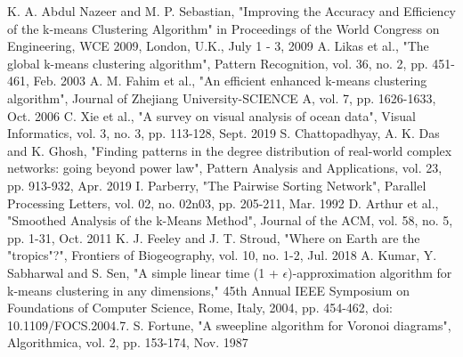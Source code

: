 \documentclass[conference,compsoc]{IEEEtran}
\begin{document}
\begin{thebibliography}{00}
 K. A. Abdul Nazeer and M. P. Sebastian, "Improving the Accuracy and Efficiency of the k-means Clustering Algorithm" in Proceedings of the World Congress on Engineering, WCE 2009, London, U.K., July 1 - 3, 2009
 A. Likas et al., "The global k-means clustering algorithm", Pattern Recognition, vol. 36, no. 2, pp. 451-461, Feb. 2003
 A. M. Fahim et al., "An efficient enhanced k-means clustering algorithm", Journal of Zhejiang University-SCIENCE A, vol. 7, pp. 1626-1633, Oct. 2006
 C. Xie et al., "A survey on visual analysis of ocean data", Visual Informatics, vol. 3, no. 3, pp. 113-128, Sept. 2019
 S. Chattopadhyay, A. K. Das and K. Ghosh, "Finding patterns in the degree distribution of real-world complex networks: going beyond power law", Pattern Analysis and Applications, vol. 23, pp. 913-932, Apr. 2019
 I. Parberry, "The Pairwise Sorting Network", Parallel Processing Letters, vol. 02, no. 02n03, pp. 205-211, Mar. 1992
 D. Arthur et al., "Smoothed Analysis of the k-Means Method", Journal of the ACM, vol. 58, no. 5, pp. 1-31, Oct. 2011
 K. J. Feeley and J. T. Stroud, "Where on Earth are the "tropics"?", Frontiers of Biogeography, vol. 10, no. 1-2, Jul. 2018
 A. Kumar, Y. Sabharwal and S. Sen, "A simple linear time (1 + $\epsilon$)-approximation algorithm for k-means clustering in any dimensions," 45th Annual IEEE Symposium on Foundations of Computer Science, Rome, Italy, 2004, pp. 454-462, doi: 10.1109/FOCS.2004.7.
 S. Fortune, "A sweepline algorithm for Voronoi diagrams", Algorithmica, vol. 2, pp. 153-174, Nov. 1987
\end{thebibliography}
\end{document}

